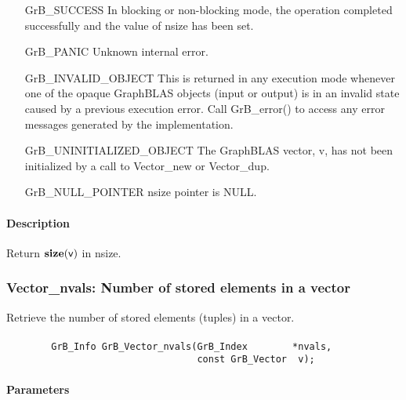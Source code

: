 \begin{itemize}[leftmargin=2.1in]
    \item[{\sf GrB\_SUCCESS}]   In blocking or non-blocking mode, the operation 
    completed successfully and the value of {\sf nsize} has been set.

    \item[{\sf GrB\_PANIC}]     Unknown internal error.
    
    \item[{\sf GrB\_INVALID\_OBJECT}] This is returned in any execution mode 
    whenever one of the opaque GraphBLAS objects (input or output) is in an invalid 
    state caused by a previous execution error.  Call {\sf GrB\_error()} to access 
    any error messages generated by the implementation.

    \item[{\sf GrB\_UNINITIALIZED\_OBJECT}]  The GraphBLAS vector, {\sf v}, has 
    not been initialized by a call to {\sf Vector\_new} or {\sf Vector\_dup}.
    
    \item[{\sf GrB\_NULL\_POINTER}]  {\sf nsize} pointer is {\sf NULL}.
\end{itemize}

\paragraph{Description}

Return $\mathbf{size}({\sf v})$ in {\sf nsize}.

\subsubsection{{\sf Vector\_nvals}: Number of stored elements in a vector}
\label{Sec:Vector_nvals}

Retrieve the number of stored elements (tuples) in a vector.

\paragraph{\syntax}

\begin{verbatim}
        GrB_Info GrB_Vector_nvals(GrB_Index        *nvals,
                                  const GrB_Vector  v);
\end{verbatim}

\paragraph{Parameters}

